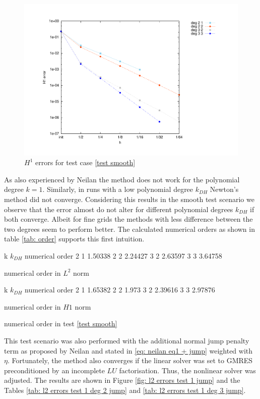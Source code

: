 \begin{figure}[H]
\centering
	\includegraphics[scale =0.45]{plots/MA1_Neilan_h1.pdf}
	\caption{$H^1$ errors for test case \ref{test smooth}}
	\label{fig: h1 errors test 1}
\end{figure}

As also experienced by Neilan the method does not work for the polynomial degree $k=1$. Similarly, in runs with a low polynomial degree $k_{DH}$ Newton's method did not converge.
Considering this results in the smooth test scenario we observe that the error almost do not alter for different polynomial degrees $k_{DH}$ if both converge. Albeit for fine grids the methods with less difference between the two degrees seem to perform better. The calculated numerical orders as shown in table \ref{tab: order} supports this first intuition.

\begin{table}[H]
\begin{subtable}[b]{0.45\textwidth}
\centering
	\pgfplotstabletypeset
	{
		k $k_{DH}$ {numerical order}
		2 1  1.50338
		2 2  2.24427
		3 2 2.63597
		3 3 3.64758
	}
	\caption{numerical order in $L^2$ norm}
\end{subtable}
\begin{subtable}[b]{0.45\textwidth}
	\pgfplotstabletypeset
	{
		k $k_{DH}$ {numerical order}
		2 1  1.65382 
		2 2  1.973
		3 2 2.39616
		3 3 2.97876
	}
	\caption{numerical order in $H1$ norm}
	\end{subtable}
\caption{numerical order in test \ref{test smooth}}
\label{tab: order}
\end{table}

This test scenario was also performed with the additional normal jump penalty term as proposed by Neilan and stated in \eqref{eq: neilan eq1 + jump} weighted with $\eta$. Fortunately, the method also converges if the linear solver was set to GMRES preconditioned by an incomplete $LU$ factorisation. Thus, the nonlinear solver was adjusted. The results are shown in Figure \ref{fig: l2 errors test 1 jump} and the Tables \ref{tab: l2 errors test 1 deg 2 jump} and \ref{tab: l2 errors test 1 deg 3 jump}. 

